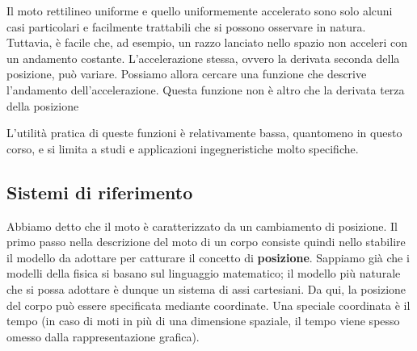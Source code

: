 
Il moto rettilineo uniforme e quello uniformemente accelerato sono solo
alcuni casi particolari e facilmente trattabili che si possono osservare
in natura. Tuttavia, è facile che, ad esempio, un razzo lanciato nello
spazio non acceleri con un andamento costante. L'accelerazione stessa,
ovvero la derivata seconda della posizione, può variare. Possiamo allora
cercare una funzione che descrive l'andamento dell'accelerazione. Questa funzione
non è altro che la derivata terza della posizione

L'utilità pratica di queste funzioni è relativamente bassa, quantomeno
in questo corso, e si limita a studi e applicazioni ingegneristiche
molto specifiche.












\newpage
\subsection*{Sistemi di riferimento}
Abbiamo detto che il moto è caratterizzato da un cambiamento di posizione. Il primo
passo nella descrizione del moto di un corpo consiste quindi nello stabilire il
modello da adottare per catturare il concetto di \textbf{posizione}. Sappiamo già
che i modelli della fisica si basano sul linguaggio matematico; il modello più
naturale che si possa adottare è dunque un sistema di assi cartesiani. Da qui, la
posizione del corpo può essere specificata mediante coordinate. Una speciale
coordinata è il tempo (in caso di moti in più di una dimensione spaziale, il
tempo viene spesso omesso dalla rappresentazione grafica).

